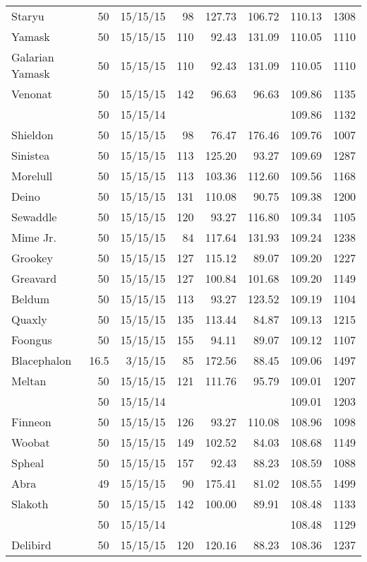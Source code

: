 \begin{longtable}{lrrrrrrr}
Staryu & 50 & 15/15/15 & 98 & 127.73 & 106.72 & 110.13 & 1308\\
Yamask & 50 & 15/15/15 & 110 & 92.43 & 131.09 & 110.05 & 1110\\
Galarian Yamask & 50 & 15/15/15 & 110 & 92.43 & 131.09 & 110.05 & 1110\\
Venonat & 50 & 15/15/15 & 142 & 96.63 & 96.63 & 109.86 & 1135\\
 & 50 & 15/15/14 & & & & 109.86 & 1132\\
Shieldon & 50 & 15/15/15 & 98 & 76.47 & 176.46 & 109.76 & 1007\\
Sinistea & 50 & 15/15/15 & 113 & 125.20 & 93.27 & 109.69 & 1287\\
Morelull & 50 & 15/15/15 & 113 & 103.36 & 112.60 & 109.56 & 1168\\
Deino & 50 & 15/15/15 & 131 & 110.08 & 90.75 & 109.38 & 1200\\
Sewaddle & 50 & 15/15/15 & 120 & 93.27 & 116.80 & 109.34 & 1105\\
Mime Jr. & 50 & 15/15/15 & 84 & 117.64 & 131.93 & 109.24 & 1238\\
Grookey & 50 & 15/15/15 & 127 & 115.12 & 89.07 & 109.20 & 1227\\
Greavard & 50 & 15/15/15 & 127 & 100.84 & 101.68 & 109.20 & 1149\\
Beldum & 50 & 15/15/15 & 113 & 93.27 & 123.52 & 109.19 & 1104\\
Quaxly & 50 & 15/15/15 & 135 & 113.44 & 84.87 & 109.13 & 1215\\
Foongus & 50 & 15/15/15 & 155 & 94.11 & 89.07 & 109.12 & 1107\\
Blacephalon & 16.5 & 3/15/15 & 85 & 172.56 & 88.45 & 109.06 & 1497\\
Meltan & 50 & 15/15/15 & 121 & 111.76 & 95.79 & 109.01 & 1207\\
 & 50 & 15/15/14 & & & & 109.01 & 1203\\
Finneon & 50 & 15/15/15 & 126 & 93.27 & 110.08 & 108.96 & 1098\\
Woobat & 50 & 15/15/15 & 149 & 102.52 & 84.03 & 108.68 & 1149\\
Spheal & 50 & 15/15/15 & 157 & 92.43 & 88.23 & 108.59 & 1088\\
Abra & 49 & 15/15/15 & 90 & 175.41 & 81.02 & 108.55 & 1499\\
Slakoth & 50 & 15/15/15 & 142 & 100.00 & 89.91 & 108.48 & 1133\\
 & 50 & 15/15/14 & & & & 108.48 & 1129\\
Delibird & 50 & 15/15/15 & 120 & 120.16 & 88.23 & 108.36 & 1237\\

\end{longtable}
